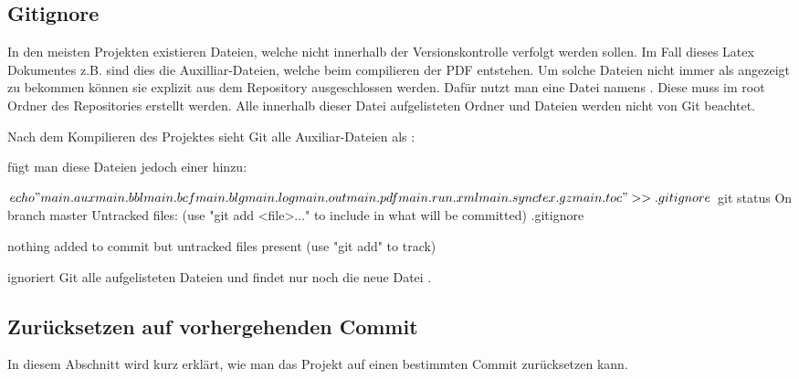 \subsection{Gitignore}
In den meisten Projekten existieren Dateien, welche nicht innerhalb der Versionskontrolle verfolgt werden sollen. Im Fall dieses Latex Dokumentes z.B. sind dies die Auxilliar-Dateien, welche beim compilieren der PDF entstehen. Um solche Dateien nicht immer als  angezeigt zu bekommen können sie explizit aus dem Repository ausgeschlossen werden. Dafür nutzt man eine Datei namens . Diese muss im root Ordner des Repositories erstellt werden. Alle innerhalb dieser Datei aufgelisteten Ordner und Dateien werden nicht von Git beachtet.

Nach dem Kompilieren des Projektes sieht Git alle Auxiliar-Dateien als :
fügt man diese Dateien jedoch einer  hinzu:
\begin{mplisting}
$ echo "main.aux
	main.bbl
	main.bcf
	main.blg
	main.log
	main.out
	main.pdf
	main.run.xml
	main.synctex.gz
	main.toc" >> .gitignore
$ git status
On branch master
Untracked files:
(use "git add <file>..." to include in what will be committed)
.gitignore

nothing added to commit but untracked files present (use "git add" to track)
\end{mplisting}
ignoriert Git alle aufgelisteten Dateien und findet nur noch die neue Datei .

\subsection{Zurücksetzen auf vorhergehenden Commit}
In diesem Abschnitt wird kurz erklärt, wie man das Projekt auf einen bestimmten Commit zurücksetzen kann.

